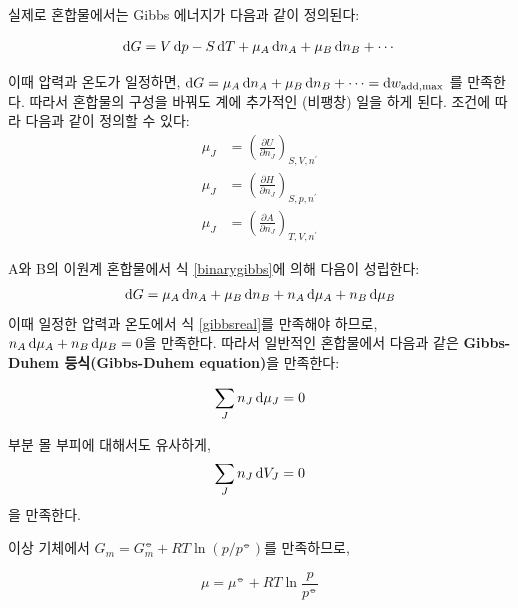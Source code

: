         실제로 혼합물에서는 Gibbs 에너지가 다음과 같이 정의된다:
        \begin{defn}\label{gibbsreal}
        \begin{equation*}
            \operatorname{d\!} G = V\operatorname{d\!} p - S\operatorname{d\!} T + \mu_A \operatorname{d\!} n_A + \mu_B \operatorname{d\!} n_B + \cdots
        \end{equation*}
        \end{defn}
        이때 압력과 온도가 일정하면, $\displaystyle\operatorname{d\!} G = \mu_A \operatorname{d\!} n_A + \mu_B \operatorname{d\!} n_B + \cdots = \operatorname{d\!} w_\mathrm{add,max}$
        를 만족한다. 따라서 혼합물의 구성을 바꿔도 계에 추가적인 (비팽창) 일을 하게 된다. 조건에 따라 다음과 같이 정의할 수 있다:
        \begin{align*}
            \mu_J &= \left(\frac{\partial U}{\partial n_J}\right)_{S,V,n^\prime}\\
            \mu_J &= \left(\frac{\partial H}{\partial n_J}\right)_{S,p,n^\prime}\\
            \mu_J &= \left(\frac{\partial A}{\partial n_J}\right)_{T,V,n^\prime}
        \end{align*}
        \par A와 B의 이원계 혼합물에서 식 \ref{binarygibbs}에 의해 다음이 성립한다:
        \begin{equation*}
            \operatorname{d\!} G = \mu_A \operatorname{d\!} n_A + \mu_B \operatorname{d\!} n_B + n_A \operatorname{d\!} \mu_A + n_B \operatorname{d\!} \mu_B
        \end{equation*}
        이때 일정한 압력과 온도에서 식 \ref{gibbsreal}를 만족해야 하므로, $n_A \operatorname{d\!} \mu_A + n_B \operatorname{d\!} \mu_B = 0$을 만족한다. 
        따라서 일반적인 혼합물에서 다음과 같은 \textbf{Gibbs-Duhem 등식(Gibbs-Duhem equation)}을 만족한다:
        \begin{law}\label{gibbsduhem}
        \begin{equation*}
            \sum_{J} n_J \operatorname{d\!} \mu_J = 0
        \end{equation*}
        \end{law}
        부분 몰 부피에 대해서도 유사하게, 
        \begin{equation*}
            \sum_{J} n_J \operatorname{d\!} V_J = 0
        \end{equation*}
        을 만족한다.
        \par 이상 기체에서 $\displaystyle G_m = G_m^\circlehbar + RT\ln{\left(p/p^\circlehbar\right)}$를 만족하므로,
        \begin{law}\label{chempotgas}
        \begin{equation*}
            \mu = \mu^\circlehbar +RT\ln{\frac{p}{p^\circlehbar}}
        \end{equation*}
        \end{law}
